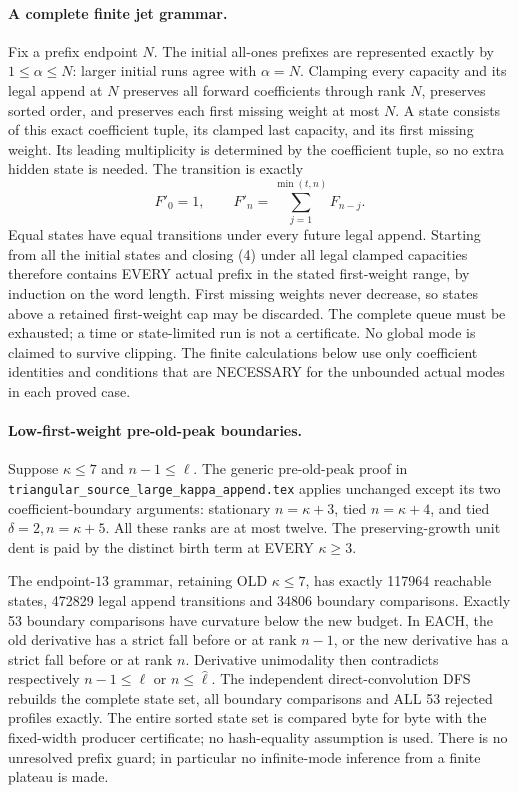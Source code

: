 \paragraph{A complete finite jet grammar.}
Fix a prefix endpoint $N$. The initial all-ones prefixes are represented
exactly by $1\le\alpha\le N$: larger initial runs agree with $\alpha=N$.
Clamping every capacity and its legal append at $N$ preserves all forward
coefficients through rank $N$, preserves sorted order, and preserves each
first missing weight at most $N$. A state consists of this exact coefficient
tuple, its clamped last capacity, and its first missing weight. Its leading
multiplicity is determined by the coefficient tuple, so no extra hidden
state is needed. The transition is exactly
\[
            F'_0=1,\qquad F'_n=\sum_{j=1}^{\min(t,n)}F_{n-j}.
                                                               \tag{4}
\]
Equal states have equal transitions under every future legal append.
Starting from all the initial states and closing (4) under all legal
clamped capacities therefore contains EVERY actual prefix in the stated
first-weight range, by induction on the word length. First missing weights
never decrease, so states above a retained first-weight cap may be discarded.
The complete queue must be exhausted; a time or state-limited run is not
a certificate. No global mode is claimed to survive clipping. The finite
calculations below use only coefficient identities and conditions that
are NECESSARY for the unbounded actual modes in each proved case.

\paragraph{Low-first-weight pre-old-peak boundaries.}
Suppose $\kappa\le7$ and $n-1\le\ell$.
The generic pre-old-peak proof in
\texttt{triangular\_source\_large\_kappa\_append.tex} applies unchanged
except its two coefficient-boundary arguments: stationary
$n=\kappa+3$, tied $n=\kappa+4$, and tied $\delta=2,n=\kappa+5$.
All these ranks are at most twelve. The preserving-growth unit dent
is paid by the distinct birth term at EVERY $\kappa\ge3$.

The endpoint-$13$ grammar, retaining OLD $\kappa\le7$, has exactly
117964 reachable states, 472829 legal append transitions and 34806
boundary comparisons. Exactly 53 boundary comparisons have curvature
below the new budget. In EACH, the old derivative has a strict fall
before or at rank $n-1$, or the new derivative has a strict fall before
or at rank $n$. Derivative unimodality then contradicts respectively
$n-1\le\ell$ or $n\le\widehat\ell$.
The independent direct-convolution DFS rebuilds the complete state set,
all boundary comparisons and ALL 53 rejected profiles exactly. The
entire sorted state set is compared byte for byte with the fixed-width
producer certificate; no hash-equality assumption is used. There is no
unresolved prefix guard; in particular no infinite-mode inference from
a finite plateau is made.

